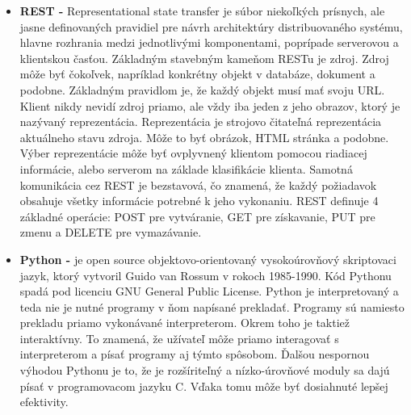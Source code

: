 \begin{itemize}
    \item \textbf{REST -} Representational state transfer je súbor niekoľkých prísnych, ale jasne definovaných pravidiel pre návrh architektúry distribuovaného systému, hlavne rozhrania medzi jednotlivými komponentami, poprípade serverovou a klientskou časťou. Základným stavebným kameňom RESTu je zdroj. Zdroj môže byť čokoľvek, napríklad konkrétny objekt v databáze, dokument a podobne. Základným pravidlom je, že každý objekt musí mať svoju URL. Klient nikdy nevidí zdroj priamo, ale vždy iba jeden z jeho obrazov, ktorý je nazývaný reprezentácia. Reprezentácia je strojovo čitateľná reprezentácia aktuálneho stavu zdroja. Môže to byť obrázok, HTML stránka a podobne. Výber reprezentácie môže byť ovplyvnený klientom pomocou riadiacej informácie, alebo serverom na základe klasifikácie klienta. Samotná komunikácia cez REST je bezstavová, čo znamená, že každý požiadavok obsahuje všetky informácie potrebné k jeho vykonaniu. REST definuje 4 základné operácie: POST pre vytváranie, GET pre získavanie, PUT pre zmenu a DELETE pre vymazávanie. \cite{Allamarajuc2010, 54r2mhdAeuyxzZPp}
    \item \textbf{Python -} je open source objektovo-orientovaný vysokoúrovňový skriptovaci jazyk, ktorý vytvoril Guido van Rossum v rokoch 1985-1990. Kód Pythonu spadá pod licenciu GNU General Public License. Python je interpretovaný a teda nie je nutné programy v ňom napísané prekladať. Programy sú namiesto prekladu priamo vykonávané interpreterom. Okrem toho je taktiež interaktívny. To znamená, že užívateľ môže priamo interagovať s interpreterom a písať programy aj týmto spôsobom. Ďalšou nespornou výhodou Pythonu je to, že je rozšíriteľný a nízko-úrovňové moduly sa dajú písať v programovacom jazyku C. Vďaka tomu môže byť dosiahnuté lepšej efektivity. \cite{CCnsn576LIGBCH2C}
    

\end{itemize}
